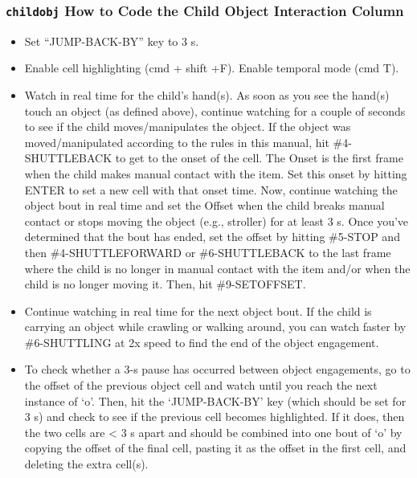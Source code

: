\documentclass[
]{book}
\providecommand{\tightlist}{%
  \setlength{\itemsep}{0pt}\setlength{\parskip}{0pt}}
\begin{document}
\hypertarget{childobj-how-to-code-the-child-object-interaction-column}{%
\subsubsection*{\texorpdfstring{\texttt{childobj} How to Code the Child Object Interaction Column}{childobj How to Code the Child Object Interaction Column}}\label{childobj-how-to-code-the-child-object-interaction-column}}

\begin{itemize}
\tightlist
\item
  Set ``JUMP-BACK-BY'' key to 3 s.
\item
  Enable cell highlighting (cmd + shift +F). Enable temporal mode (cmd T).
\item
  Watch in real time for the child's hand(s). As soon as you see the hand(s) touch an object (as defined above), continue watching for a couple of seconds to see if the child moves/manipulates the object. If the object was moved/manipulated according to the rules in this manual, hit \#4-SHUTTLEBACK to get to the onset of the cell. The Onset is the first frame when the child makes manual contact with the item. Set this onset by hitting ENTER to set a new cell with that onset time. Now, continue watching the object bout in real time and set the Offset when the child breaks manual contact or stops moving the object (e.g., stroller) for at least 3 s. Once you've determined that the bout has ended, set the offset by hitting \#5-STOP and then \#4-SHUTTLEFORWARD or \#6-SHUTTLEBACK to the last frame where the child is no longer in manual contact with the item and/or when the child is no longer moving it. Then, hit \#9-SETOFFSET.
\item
  Continue watching in real time for the next object bout. If the child is carrying an object while crawling or walking around, you can watch faster by \#6-SHUTTLING at 2x speed to find the end of the object engagement.
\item
  To check whether a 3-s pause has occurred between object engagements, go to the offset of the previous object cell and watch until you reach the next instance of `o'. Then, hit the `JUMP-BACK-BY' key (which should be set for 3 s) and check to see if the previous cell becomes highlighted. If it does, then the two cells are \textless{} 3 s apart and should be combined into one bout of `o' by copying the offset of the final cell, pasting it as the offset in the first cell, and deleting the extra cell(s).
\end{itemize}
\end{document}

